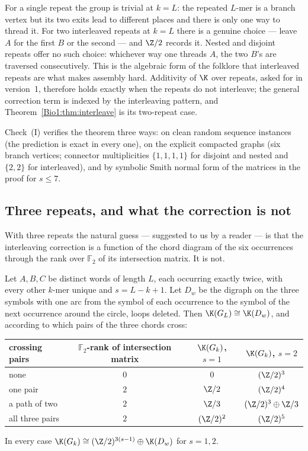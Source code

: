 \begin{remark}[Reading]\label{Bio1:rem:reading}
For a single repeat the group is trivial at $k=L$: the repeated $L$-mer is a branch vertex
but its two exits lead to different places and there is only one way to thread it. For
two interleaved repeats at $k=L$ there is a genuine choice --- leave $A$ for the first $B$
or the second --- and $\Z/2$ records it. Nested and disjoint repeats offer no such
choice: whichever way one threads $A$, the two $B$'s are traversed consecutively. This is
the algebraic form of the folklore that interleaved repeats are what makes assembly hard.
Additivity of $\K$ over repeats, asked for in version~1, therefore holds exactly when the
repeats do not interleave; the general correction term is indexed by the interleaving
pattern, and Theorem~\ref{Bio1:thm:interleave} is its two-repeat case.
\end{remark}

Check~(I) verifies the theorem three ways: on clean random sequence instances (the
prediction is exact in every one), on the explicit compacted graphs (six branch vertices;
connector multiplicities $\{1,1,1,1\}$ for disjoint and nested and $\{2,2\}$ for
interleaved), and by symbolic Smith normal form of the matrices in the proof for
$s\le7$.

\subsection*{Three repeats, and what the correction is not}

With three repeats the natural guess --- suggested to us by a reader --- is that the
interleaving correction is a function of the chord diagram of the six occurrences through
the rank over $\mathbb F_2$ of its intersection matrix. It is not.

\begin{proposition}\label{Bio1:prop:three}
Let $A,B,C$ be distinct words of length $L$, each occurring exactly twice, with every other
$k$-mer unique and $s=L-k+1$. Let $D_w$ be the digraph on the three symbols with one arc
from the symbol of each occurrence to the symbol of the next occurrence around the circle,
loops deleted. Then $\K(G_L)\cong\K(D_w)$, and according to which pairs of the three chords
cross:
\begin{center}\small
\begin{tabular}{lccc}
\toprule
crossing pairs & $\mathbb F_2$-rank of intersection matrix & $\K(G_k)$, $s=1$ & $\K(G_k)$, $s=2$\\
\midrule
none            & $0$ & $0$            & $(\Z/2)^{3}$\\
one pair        & $2$ & $\Z/2$         & $(\Z/2)^{4}$\\
a path of two   & $2$ & $\Z/3$         & $(\Z/2)^{3}\oplus\Z/3$\\
all three pairs & $2$ & $(\Z/2)^{2}$   & $(\Z/2)^{5}$\\
\bottomrule
\end{tabular}
\end{center}
In every case $\K(G_k)\cong(\Z/2)^{3(s-1)}\oplus\K(D_w)$ for $s=1,2$.
\end{proposition}

